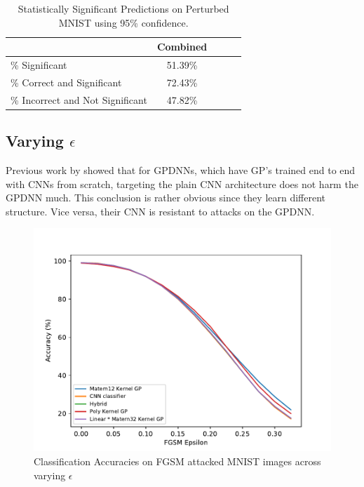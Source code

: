 \documentclass{article}
\begin{document}
\begin{table}[h]
\caption{Statistically Significant Predictions on Perturbed MNIST using 95\% confidence.}
\vskip 0.15in
\begin{center}
\begin{small}
\begin{sc}
\begin{tabular}{lcccr}
\toprule
							&  Combined  	\\
\midrule
\% Significant				& 51.39\%		\\
\% Correct and Significant  & 72.43\%  		\\
\% Incorrect and Not Significant & 47.82\% \\
\bottomrule
\end{tabular}
\end{sc}
\end{small}
\end{center}
\vskip -0.1in
\label{tab:adv_statsig}
\end{table}



\subsection{Varying $\epsilon$}
Previous work by \citet{Bradshaw2017} showed that for GPDNNs, which have GP's trained end to end with CNNs from scratch, targeting the plain CNN architecture does not harm the GPDNN much. This conclusion is rather obvious since they learn different structure. Vice versa, their CNN is resistant to attacks on the GPDNN.

\begin{figure}[h!]
\centering
\includegraphics[width=\hsize]{./figures/adversarial/epsilons.pdf}
\caption{Classification Accuracies on FGSM attacked MNIST images across varying $\epsilon$}
\label{fig:adv:epsilons}
\end{figure}
\end{document}
